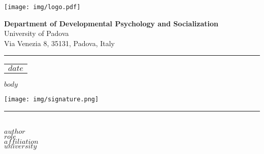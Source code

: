 \documentclass[12pt,a4paper]{letter}
\begin{document}
	\begin{minipage}[c]{0.25\linewidth}
			\centering
			\texttt{[image: img/logo.pdf]}
			\vspace{-0.5em}
	\end{minipage}
\hfill %
    \begin{minipage}[c]{21.5em}
        \raggedright
        \footnotesize{\textbf{\textcolor{unipd}{Department of Developmental Psychology and Socialization}}} \\
        \footnotesize{University of Padova} \\
        \footnotesize{Via Venezia 8, 35131, Padova, Italy}
    \end{minipage}
\vspace{3em}%
\rule{\linewidth}{1pt} %
\vspace{-3em}%

\hfill
\begin{tabular}{l @{}}
	$date$ \\ %
\end{tabular}
\vspace{2em}

$body$

\texttt{[image: img/signature.png]}\\
\rule{5cm}{1pt} \\%
\small{\textbf{\textcolor{unipd}{$author$}}} \\
\small{$role$}\\
\small{$affiliation$} \\
\small{$university$} \\
\end{document}
